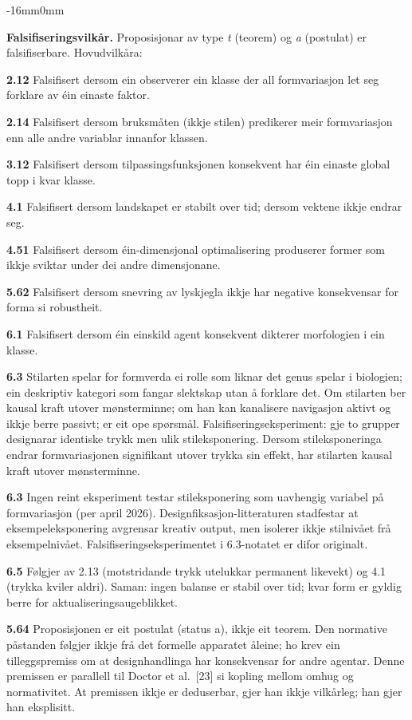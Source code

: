 \documentclass[10pt,oneside]{book}
\newenvironment{widebody}{%
  \begin{adjustwidth}{-16mm}{0mm}%
}{%
  \end{adjustwidth}%
}
\begin{document}
\begin{widebody}
{\bigskip
\textbf{Falsifiseringsvilkår.} Proposisjonar av type \textit{t} (teorem) og \textit{a} (postulat) er falsifiserbare. Hovudvilkåra:

\textbf{2.12} Falsifisert dersom ein observerer ein klasse der all formvariasjon let seg forklare av éin einaste faktor.

\textbf{2.14} Falsifisert dersom bruksmåten (ikkje stilen) predikerer meir formvariasjon enn alle andre variablar innanfor klassen.

\textbf{3.12} Falsifisert dersom tilpassingsfunksjonen konsekvent har éin einaste global topp i kvar klasse.

\textbf{4.1} Falsifisert dersom landskapet er stabilt over tid; dersom vektene ikkje endrar seg.

\textbf{4.51} Falsifisert dersom éin-dimensjonal optimalisering produserer former som ikkje sviktar under dei andre dimensjonane.

\textbf{5.62} Falsifisert dersom snevring av lyskjegla ikkje har negative konsekvensar for forma si robustheit.

\textbf{6.1} Falsifisert dersom éin einskild agent konsekvent dikterer morfologien i ein klasse.

\textbf{6.3} Stilarten spelar for formverda ei rolle som liknar det genus spelar i biologien; ein deskriptiv kategori som fangar slektskap utan å forklare det. Om stilarten ber kausal kraft utover mønsterminne; om han kan kanalisere navigasjon aktivt og ikkje berre passivt; er eit ope spørsmål. Falsifiseringseksperiment: gje to grupper designarar identiske trykk men ulik stileksponering. Dersom stileksponeringa endrar formvariasjonen signifikant utover trykka sin effekt, har stilarten kausal kraft utover mønsterminne.

\textbf{6.3} Ingen reint eksperiment testar stileksponering som uavhengig variabel på formvariasjon (per april 2026). Designfiksasjon-litteraturen stadfestar at eksempeleksponering avgrensar kreativ output, men isolerer ikkje stilnivået frå eksempelnivået. Falsifiseringseksperimentet i 6.3-notatet er difor originalt.

\textbf{6.5} Følgjer av 2.13 (motstridande trykk utelukkar permanent likevekt) og 4.1 (trykka kviler aldri). Saman: ingen balanse er stabil over tid; kvar form er gyldig berre for aktualiseringsaugeblikket.

\textbf{5.64} Proposisjonen er eit postulat (status a), ikkje eit teorem. Den normative påstanden følgjer ikkje frå det formelle apparatet åleine; ho krev ein tilleggspremiss om at designhandlinga har konsekvensar for andre agentar. Denne premissen er parallell til Doctor et al.\ [23] si kopling mellom omhug og normativitet. At premissen ikkje er deduserbar, gjer han ikkje vilkårleg; han gjer han eksplisitt.

}
\end{widebody}
\end{document}
